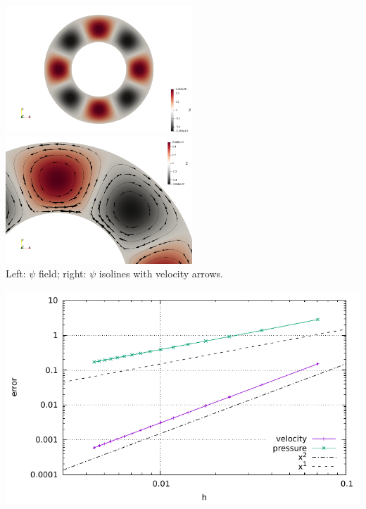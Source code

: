 \begin{center}
\includegraphics[width=7cm]{python_codes/fieldstone_09/psi}
\includegraphics[width=7cm]{python_codes/fieldstone_09/psi_arrows}\\
{\small Left: $\psi$ field; right: $\psi$ isolines with velocity arrows.}
\end{center}

\includegraphics[width=15cm]{python_codes/fieldstone_09/errors}

